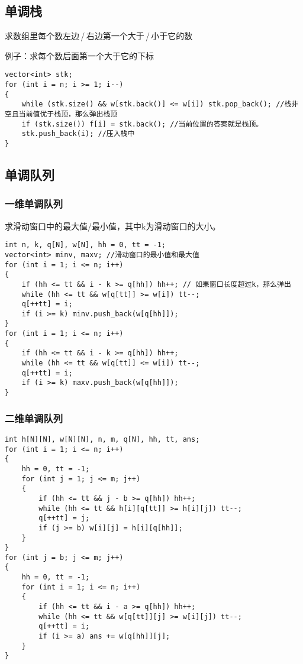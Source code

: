 \documentclass[a4paper, fontset=none]{ctexart}
\begin{document}
\subsection{单调栈}

求数组里每个数左边\,/\,右边第一个大于\,/\,小于它的数

例子：求每个数后面第一个大于它的下标
\begin{verbatim}
vector<int> stk;
for (int i = n; i >= 1; i--)
{
    while (stk.size() && w[stk.back()] <= w[i]) stk.pop_back(); //栈非空且当前值优于栈顶，那么弹出栈顶
    if (stk.size()) f[i] = stk.back(); //当前位置的答案就是栈顶。
    stk.push_back(i); //压入栈中
}
\end{verbatim}

\subsection{单调队列}
\subsubsection{一维单调队列}

求滑动窗口中的最大值/最小值，其中k为滑动窗口的大小。
\begin{verbatim}
int n, k, q[N], w[N], hh = 0, tt = -1;
vector<int> minv, maxv; //滑动窗口的最小值和最大值
for (int i = 1; i <= n; i++)
{
    if (hh <= tt && i - k >= q[hh]) hh++; // 如果窗口长度超过k，那么弹出
    while (hh <= tt && w[q[tt]] >= w[i]) tt--;
    q[++tt] = i;
    if (i >= k) minv.push_back(w[q[hh]]);
}
for (int i = 1; i <= n; i++)
{
    if (hh <= tt && i - k >= q[hh]) hh++;
    while (hh <= tt && w[q[tt]] <= w[i]) tt--;
    q[++tt] = i;
    if (i >= k) maxv.push_back(w[q[hh]]);
}
\end{verbatim}
\subsubsection{二维单调队列}
\begin{verbatim}
int h[N][N], w[N][N], n, m, q[N], hh, tt, ans;
for (int i = 1; i <= n; i++)
{
    hh = 0, tt = -1;
    for (int j = 1; j <= m; j++)
    {
        if (hh <= tt && j - b >= q[hh]) hh++;
        while (hh <= tt && h[i][q[tt]] >= h[i][j]) tt--;
        q[++tt] = j;
        if (j >= b) w[i][j] = h[i][q[hh]];
    }
}
for (int j = b; j <= m; j++)
{
    hh = 0, tt = -1;
    for (int i = 1; i <= n; i++)
    {
        if (hh <= tt && i - a >= q[hh]) hh++;
        while (hh <= tt && w[q[tt]][j] >= w[i][j]) tt--;
        q[++tt] = i;
        if (i >= a) ans += w[q[hh]][j];
    }
}
\end{verbatim}
\end{document}
